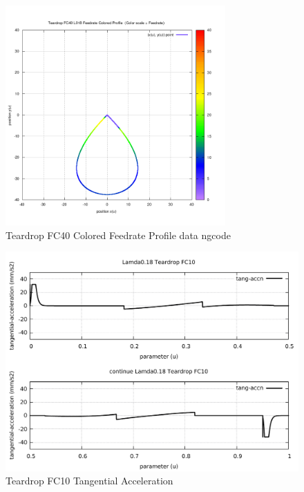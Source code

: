 \begin{figure}
	\caption     {Teardrop FC40 Colored Feedrate Profile data ngcode}
	\label{20-img-Teardrop-FC40-Colored-Feedrate-Profile-data_ngcode.png}
	\includegraphics[width=0.75\textwidth]{Chap4/appendix/app-Teardrop/plots/20-img-Teardrop-FC40-Colored-Feedrate-Profile-data_ngcode.png}
\end{figure}

\clearpage
\pagebreak

\begin{figure}
	\caption     {Teardrop FC10 Tangential Acceleration}
	\label{21-img-Teardrop-FC10-Tangential-Acceleration.pdf}
	\includegraphics[width=1.00\textwidth]{Chap4/appendix/app-Teardrop/plots/21-img-Teardrop-FC10-Tangential-Acceleration.pdf}
\end{figure}


